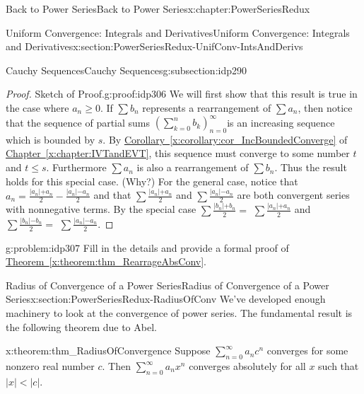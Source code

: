 \begin{chapterptx}{Back to Power Series}{}{Back to Power Series}{}{}{x:chapter:PowerSeriesRedux}
\begin{sectionptx}{Uniform Convergence: Integrals and Derivatives}{}{Uniform Convergence: Integrals and Derivatives}{}{}{x:section:PowerSeriesRedux-UnifConv-IntsAndDerivs}
\begin{subsectionptx}{Cauchy Sequences}{}{Cauchy Sequences}{}{}{g:subsection:idp290}
			\begin{proof}{Sketch of Proof.}{g:proof:idp306}
				We will first show that this result is true in the case where \(a_n\geq 0\). If \(\sum b_n\) represents a rearrangement of \(\sum a_n\), then notice that the sequence of partial sums \(\left(\sum_{k=0}^nb_k\right)_{n=0}^\infty\)is an increasing sequence which is bounded by \(s\). By \hyperref[x:corollary:cor_IncBoundedConverge]{Corollary~{\xreffont\ref{x:corollary:cor_IncBoundedConverge}}} of \hyperref[x:chapter:IVTandEVT]{Chapter~{\xreffont\ref{x:chapter:IVTandEVT}}}, this sequence must converge to some number \(t\) and \(t\leq s\). Furthermore \(\sum a_n\) is also a rearrangement of \(\sum b_n\). Thus the result holds for this special case. (Why?) For the general case, notice that \(a_n=\frac{|a_n\mathopen|+a_n}{2}-\frac{|a_n\mathopen|-a_n}{2}\) and that \(\sum\frac{|a_n\mathopen|+a_n}{2}\) and \(\sum\frac{|a_n\mathopen|-a_n}{2}\) are both convergent series with nonnegative terms. By the special case \(\sum\frac{|b_n\mathopen|+b_n}{2}=\) \(\sum\frac{|a_n\mathopen|+a_n}{2}\) and \(\sum\frac{|b_n\mathopen|-b_n}{2}=\) \(\sum\frac{|a_n\mathopen|-a_n}{2}\).%
			\end{proof}
			\begin{problem}{}{g:problem:idp307}%
				 Fill in the details and provide a formal proof of \hyperref[x:theorem:thm_RearrageAbsConv]{Theorem~{\xreffont\ref{x:theorem:thm_RearrageAbsConv}}}.%
			\end{problem}
		\end{subsectionptx}
	\end{sectionptx}
	\typeout{************************************************}
	\typeout{************************************************}
	\begin{sectionptx}{Radius of Convergence of a Power Series}{}{Radius of Convergence of a Power Series}{}{}{x:section:PowerSeriesRedux-RadiusOfConv}
		We've developed enough machinery to look at the convergence of power series. The fundamental result is the following theorem due to Abel.%
		\begin{theorem}{}{}{x:theorem:thm_RadiusOfConvergence}%
			 Suppose \(\sum_{n=0}^\infty a_nc^n\) converges for some nonzero real number \(c\). Then \(\sum_{n=0}^\infty a_nx^n\) converges absolutely for all \(x\) such that \(|x|\lt |c|\).%
		\end{theorem}

\end{sectionptx}
\end{chapterptx}
